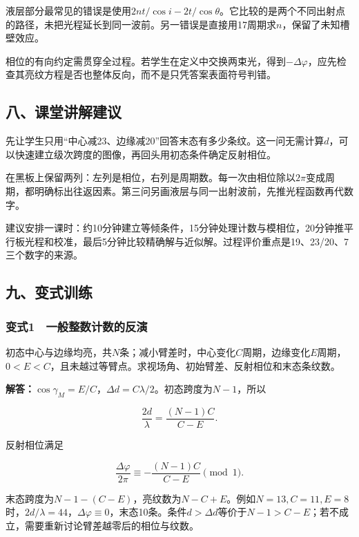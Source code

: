 \documentclass[12pt,a4paper,fontset=fandol]{ctexart}
\begin{document}
液层部分最常见的错误是使用\(2nt/\cos i-2t/\cos\theta\)。它比较的是两个不同出射点的路径，未把光程延长到同一波前。另一错误是直接用17周期求\(n\)，保留了未知槽壁效应。

相位的有向约定需贯穿全过程。若学生在定义中交换两束光，得到\(-\Delta\varphi\)，应先检查其亮纹方程是否也整体反向，而不是只凭答案表面符号判错。

\subsection{八、课堂讲解建议}\label{ux516bux8bfeux5802ux8bb2ux89e3ux5efaux8bae}

先让学生只用``中心减23、边缘减20''回答末态有多少条纹。这一问无需计算\(d\)，可以快速建立级次跨度的图像，再回头用初态条件确定反射相位。

在黑板上保留两列：左列是相位，右列是周期数。每一次由相位除以\(2\pi\)变成周期，都明确标出往返因素。第三问另画液层与同一出射波前，先推光程函数再代数字。

建议安排一课时：约10分钟建立等倾条件，15分钟处理计数与模相位，20分钟推平行板光程和校准，最后5分钟比较精确解与近似解。过程评价重点是19、23/20、7三个数字的来源。

\subsection{九、变式训练}\label{ux4e5dux53d8ux5f0fux8badux7ec3}

\subsubsection{变式1　一般整数计数的反演}\label{ux53d8ux5f0f1-ux4e00ux822cux6574ux6570ux8ba1ux6570ux7684ux53cdux6f14}

初态中心与边缘均亮，共\(N\)条；减小臂差时，中心变化\(C\)周期，边缘变化\(E\)周期，\(0<E<C\)，且未越过等臂点。求视场角、初始臂差、反射相位和末态条纹数。

\textbf{解答：}\(\cos\gamma_M=E/C\)，\(\Delta d=C\lambda/2\)。初态跨度为\(N-1\)，所以

\[
\frac{2d}{\lambda}=\frac{(N-1)C}{C-E}.
\]

反射相位满足

\[
\frac{\Delta\varphi}{2\pi}
\equiv-\frac{(N-1)C}{C-E}\pmod1.
\]

末态跨度为\(N-1-(C-E)\)，亮纹数为\(N-C+E\)。例如\(N=13,C=11,E=8\)时，\(2d/\lambda=44\)，\(\Delta\varphi\equiv0\)，末态10条。条件\(d>\Delta d\)等价于\(N-1>C-E\)；若不成立，需要重新讨论臂差越零后的相位与纹数。
\end{document}
